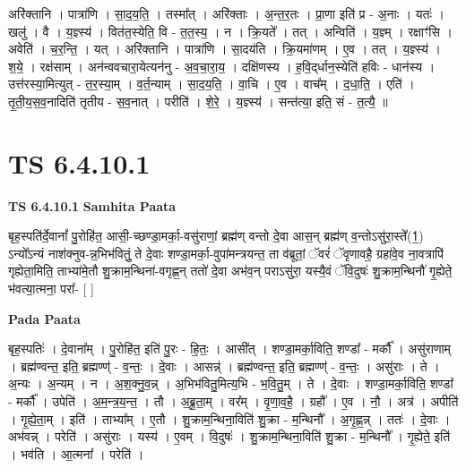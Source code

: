 \documentclass[17pt]{extarticle}
\begin{document}
अरि॑क्तानि । पात्रा॑णि । सा॒द॒य॒ति॒ । तस्मा᳚त् । अरि॑क्ताः । अ॒न्त॒र॒तः । प्रा॒णा इति॑ प्र - अ॒नाः । यतः॑ । खलु॑ । वै । य॒ज्ञ्स्य॑ । वित॑त॒स्येति॒ वि - त॒त॒स्य॒ । न । क्रि॒यते᳚ । तत् । अन्विति॑ । य॒ज्ञ्म् । रक्षाꣳ॑सि । अवेति॑ । च॒र॒न्ति॒ । यत् । अरि॑क्तानि । पात्रा॑णि । सा॒दय॑ति । क्रि॒यमा॑णम् । ए॒व । तत् । य॒ज्ञ्स्य॑ । श॒ये॒ । रक्ष॑साम् । अन॑न्ववचारा॒येत्यन॑नु - अ॒व॒चा॒रा॒य॒ । दक्षि॑णस्य । ह॒वि॒द्‌र्धान॒स्येति॑ हविः - धान॑स्य । उत्त॑रस्या॒मित्युत् - त॒र॒स्या॒म् । व॒र्त॒न्याम् । सा॒द॒य॒ति॒ । वा॒चि । ए॒व । वाच᳚म् । द॒धा॒ति॒ । एति॑ । तृ॒ती॒य॒स॒व॒नादिति॑ तृतीय - स॒व॒नात् । परीति॑ । शे॒रे॒ । य॒ज्ञ्स्य॑ । सन्त॑त्या॒ इति॒ सं - त॒त्यै॒ ॥  \newline





\section{ TS 6.4.10.1 }

\textbf{TS 6.4.10.1 } \newline
\textbf{Samhita Paata} \newline

बृह॒स्पति॑र्दे॒वानां᳚ पु॒रोहि॑त॒ आसी॒-च्छण्डा॒मर्का॒-वसु॑राणां॒ ब्रह्म॑ण् वन्तो दे॒वा आस॒न् ब्रह्म॑ण् व॒न्तोऽसु॑रा॒स्ते᳚(1॒) ऽन्यो᳚ऽन्यं नाश॑क्नुव-न्न॒भिभ॑वितुं॒ ते दे॒वाः शण्डा॒मर्का॒-वुपा॑मन्त्रयन्त॒ ता व॑ब्रूतां॒ ॅवरं॑ ॅवृणावहै॒ ग्रहा॑वे॒व ना॒वत्रापि॑ गृह्येता॒मिति॒ ताभ्या॑मे॒तौ शु॒क्राम॒न्थिना॑-वगृह्ण॒न् ततो॑ दे॒वा अभ॑व॒न् पराऽसु॑रा॒ यस्यै॒वं ॅवि॒दुषः॑ शु॒क्राम॒न्थिनौ॑ गृ॒ह्येते॒ भ॑वत्या॒त्मना॒ परा᳚- [  ] \newline

\textbf{Pada Paata} \newline

बृह॒स्पतिः॑ । दे॒वाना᳚म् । पु॒रोहि॑त॒ इति॑ पु॒रः - हि॒तः॒ । आसी᳚त् । शण्डा॒मर्का॒विति॒ शण्डा᳚ - मर्कौ᳚ । असु॑राणाम् । ब्रह्म॑ण्वन्त॒ इति॒ ब्रह्मण्ण्॑ - व॒न्तः॒ । दे॒वाः । आसन्न्॑ । ब्रह्म॑ण्वन्त॒ इति॒ ब्रह्मण्ण्॑ - व॒न्तः॒ । असु॑राः । ते । अ॒न्यः । अ॒न्यम् । न । अ॒श॒क्नु॒व॒न्न् । अ॒भिभ॑वितु॒मित्य॒भि - भ॒वि॒तु॒म् । ते । दे॒वाः । शण्डा॒मर्का॒विति॒ शण्डा᳚ - मर्कौ᳚ । उपेति॑ । अ॒म॒न्त्र॒य॒न्त॒ । तौ । अ॒ब्रू॒ता॒म् । वर᳚म् । वृ॒णा॒व॒है॒ । ग्रहौ᳚ । ए॒व । नौ॒ । अत्र॑ । अपीति॑ । गृ॒ह्ये॒ता॒म् । इति॑ । ताभ्या᳚म् । ए॒तौ । शु॒क्राम॒न्थिना॒विति॑ शु॒क्रा - म॒न्थिनौ᳚ । अ॒गृ॒ह्ण॒न्न् । ततः॑ । दे॒वाः । अभ॑वन्न् । परेति॑ । असु॑राः । यस्य॑ । ए॒वम् । वि॒दुषः॑ । शु॒क्राम॒न्थिना॒विति॑ शु॒क्रा - म॒न्थिनौ᳚ । गृ॒ह्येते॒ इति॑ । भव॑ति । आ॒त्मना᳚ । परेति॑ ।  \newline
\end{document}
